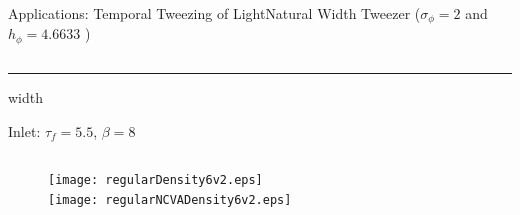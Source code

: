 \begin{frame}[c]{Applications: Temporal Tweezing of Light}{\textcolor{paleblue}{Natural Width Tweezer} ($\sigma_\phi = 2$ and $h_\phi  = 4.6633$ )}
\begin{columns}
\begin{column}{0.75\textwidth}
\hrule width\textwidth 

\vspace{0.5em}
{\small Inlet:  $\tau_f =5.5$, $\beta = 8$ }
\begin{columns}
\begin{column}{0.5\textwidth}
\centering
\vspace{-1em}
\begin{figure}
\hspace{2em}\texttt{[image: regularDensity6v2.eps]}  \\
\vspace{-0.5em}
\hspace{2em}\texttt{[image: regularNCVADensity6v2.eps]} 
\end{figure}
\end{column}
\begin{column}{0.5\textwidth}
\vspace{-0.5em} \raggedright
\hspace{-2em}%
\end{column}
\end{columns}
\end{column}
\end{columns}
\end{frame}

